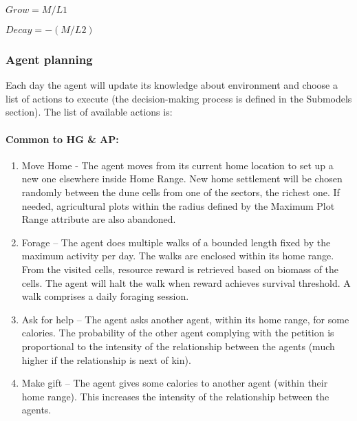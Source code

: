 \begin{enumerate}
\begin{enumerate}
\begin{enumeration}
	$Grow = M/L1$

	$Decay = -(M/L2)$

\subsubsection{Agent planning}
Each day the agent will update its knowledge about environment and choose a list of actions to
execute (the decision-making process is defined in the Submodels section). The list of available
actions is:


\paragraph{Common to HG & AP:}

\begin{enumerate}

\item Move Home - The agent moves from its current home location to set up a new one
elsewhere inside Home Range. New home settlement will be chosen randomly
between the dune cells from one of the sectors, the richest one. If needed, agricultural
plots within the radius defined by the Maximum Plot Range attribute are also
abandoned.
\item Forage – The agent does multiple walks of a bounded length fixed by the maximum
activity per day. The walks are enclosed within its home range. From the visited cells,
resource reward is retrieved based on biomass of the cells. The agent will halt the
walk when reward achieves survival threshold. A walk comprises a daily foraging
session.
\item Ask for help – The agent asks another agent, within its home range, for some
calories. The probability of the other agent complying with the petition is proportional
to the intensity of the relationship between the agents (much higher if the relationship
is next of kin).
\item Make gift – The agent gives some calories to another agent (within their home
range). This increases the intensity of the relationship between the agents.



\end{enumerate}
\end{enumeration}
\end{enumerate}
\end{enumerate}
